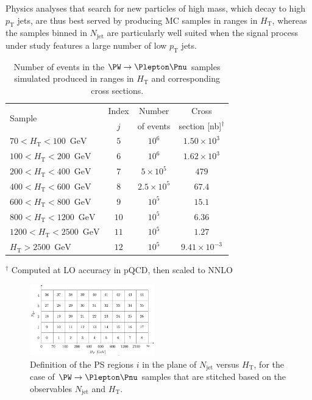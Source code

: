 \documentclass[twocolumn,epjc3]{svjour3}
\newcommand{\pT}{\ensuremath{p_{\textrm{T}}}\xspace}
\newcommand{\HT}{\ensuremath{H_{\mathrm{T}}}\xspace}
\newcommand{\GeV}{\ensuremath{\textrm{GeV}}\xspace}
\newcommand{\jet}{\ensuremath{\textrm{jet}}\xspace}
\begin{document}
Physics analyses that search for new particles of high mass, which decay to high $\pT$ jets, are thus best served by producing MC samples in ranges in $\HT$,
whereas the samples binned in $N_{\jet}$ are particularly well suited when the signal process under study features a large number of low $\pT$ jets.

\begin{table}
\caption{
  Number of events in the $\PW \to \Plepton\Pnu$ samples simulated produced in ranges in $\HT$ and corresponding cross sections.
}
\label{tab:samples_WJets_vs_Njet_and_HT}
\def\arraystretch{1.3}
\begin{tabular}{l|c|c|c}
\hline
\multirow{2}{20mm}{Sample} & Index & Number    & Cross                    \\
                           & $j$   & of events & section [nb]$^{\dagger}$ \\
\hline
\hline
$  70 < \HT <  100$~\GeV   &  $5$  &            $10^{6}$ & $1.50 \times 10^{3}$ \\
$ 100 < \HT <  200$~\GeV   &  $6$  &            $10^{6}$ & $1.62 \times 10^{3}$ \\
$ 200 < \HT <  400$~\GeV   &  $7$  & $5   \times 10^{5}$ & $479$ \\
$ 400 < \HT <  600$~\GeV   &  $8$  & $2.5 \times 10^{5}$ & $67.4$ \\
$ 600 < \HT <  800$~\GeV   &  $9$  &            $10^{5}$ & $15.1$ \\
$ 800 < \HT < 1200$~\GeV   & $10$  &            $10^{5}$ & $6.36$ \\
$1200 < \HT < 2500$~\GeV   & $11$  &            $10^{5}$ & $1.27$ \\
$       \HT > 2500$~\GeV   & $12$  &            $10^{5}$ & $9.41 \times 10^{-3}$ \\
\hline
\end{tabular}
$^{\dagger}$ Computed at LO accuracy in pQCD, then scaled to NNLO
\end{table}

\begin{figure}
\includegraphics[width=0.48\textwidth]{plots/regions_WJets_vs_Njet_and_HT.pdf}
\caption{
  Definition of the PS regions $i$ in the plane of $N_{\jet}$ versus $\HT$,
  for the case of $\PW \to \Plepton\Pnu$ samples that are stitched based on the observables $N_{\jet}$ and $\HT$.
}
\label{fig:regions_WJets_vs_Njet_and_HT}
\end{figure}
\end{document}
